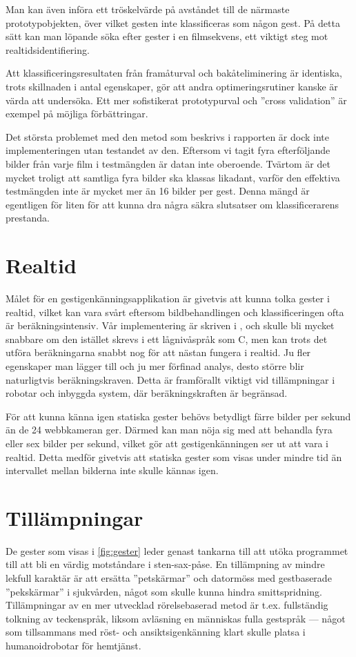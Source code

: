 \documentclass[../rapport_MVEX01-11-05]{subfiles}
\begin{document}
Man kan även införa ett tröskelvärde på avståndet till de närmaste
prototypobjekten, över vilket gesten inte klassificeras som någon
gest. På detta sätt kan man löpande söka efter gester
i en filmsekvens, ett viktigt steg mot
realtids\-identifiering.

Att klassificeringsresultaten från framåturval och bakåteliminering är 
identiska, trots skillnaden i antal egenskaper, gör att andra
optimeringsrutiner kanske är värda att undersöka.
Ett mer sofistikerat prototypurval och ''cross validation'' är exempel
på möjliga förbättringar.

Det största problemet med den metod som beskrivs i rapporten är dock
inte implementeringen utan testandet av den. Eftersom vi tagit fyra
efterföljande bilder
från varje film i testmängden är datan inte oberoende. Tvärtom är det
mycket troligt att samtliga fyra bilder ska klassas likadant, varför
den effektiva testmängden inte är mycket mer än 16 bilder per
gest. Denna mängd är egentligen för liten för att kunna dra några
säkra slutsatser om klassificerarens prestanda.

\section{Realtid}
Målet för en gestigenkänningsapplikation är givetvis att kunna tolka
gester i realtid, vilket kan vara svårt eftersom bildbehandlingen och
klassificeringen ofta är beräkningsintensiv. Vår implementering
är skriven i \MATLAB, och skulle bli mycket snabbare om den istället
skrevs i ett lågnivåspråk som C, men kan trots det utföra
beräkningarna snabbt nog för att nästan fungera i realtid.
Ju fler egenskaper man lägger till och ju mer förfinad analys, desto
större blir naturligtvis beräkningskraven. Detta är framförallt
viktigt vid tillämpningar i robotar och inbyggda system, där beräkningskraften
är begränsad.

För att kunna känna igen statiska gester behövs betydligt färre bilder per
sekund än de 24 webbkameran ger. Därmed kan man nöja sig med
att behandla fyra eller sex bilder per
sekund, vilket gör att gestigenkänningen ser ut att vara i realtid.
Detta medför givetvis att statiska gester som visas under mindre tid
än intervallet mellan bilderna inte skulle kännas igen.

\section{Tillämpningar}
De gester som visas i \vref{fig:gester} leder genast tankarna
till att utöka programmet till att bli en värdig motståndare
i sten-sax-påse. En tillämpning av mindre lekfull karaktär är
att ersätta ''petskärmar'' och datormöss med gestbaserade ''pekskärmar'' i
sjukvården, något som skulle kunna hindra smittspridning.
Tillämpningar av en mer utvecklad rörelsebaserad metod är t.ex.
fullständig tolkning av teckenspråk,
liksom avläsning en människas fulla gestspråk
--- något som tillsammans med röst- och ansiktsigenkänning
klart skulle platsa i humanoidrobotar för hemtjänst.
\end{document}
